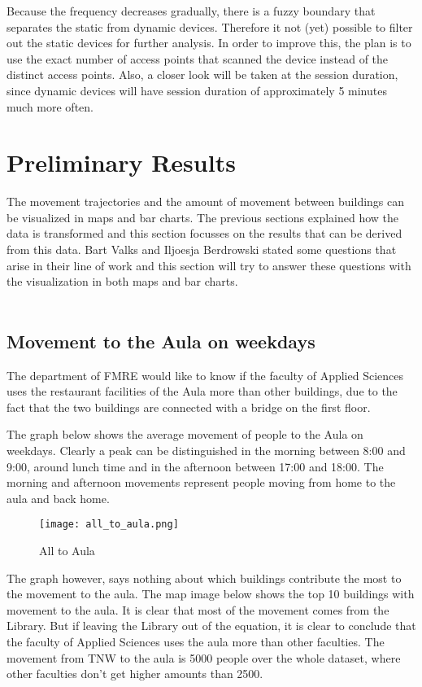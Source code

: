 Because the frequency decreases gradually, there is a fuzzy boundary that separates the static from dynamic devices. Therefore it not (yet) possible to filter out the static devices for further analysis. In order to improve this, the plan is to use the exact number of access points that scanned the device instead of the distinct access points. Also, a closer look will be taken at the session duration, since dynamic devices will have session duration of approximately 5 minutes much more often. 


\section{Preliminary Results}\label{results}

The movement trajectories and the amount of movement between buildings can be visualized in maps and bar charts. The previous sections explained how the data is transformed and this section focusses on the results that can be derived from this data. Bart Valks and Iljoesja Berdrowski stated some questions that arise in their line of work and this section will try to answer these questions with the visualization in both maps and bar charts.
\\\\
\subsection{Movement to the Aula on weekdays}

The department of FMRE would like to know if the faculty of Applied Sciences uses the restaurant facilities of the Aula more than other buildings, due to the fact that the two buildings are connected with a bridge on the first floor.

The graph below shows the average movement of people to the Aula on weekdays. Clearly a peak can be distinguished in the morning between 8:00 and 9:00, around lunch time and in the afternoon between 17:00 and 18:00. The morning and afternoon movements represent people moving from home to the aula and back home.
\begin{figure}[H]
\centering
\texttt{[image: all\_to\_aula.png]}
\captionsetup{justification=centering}
\caption{All to Aula}
\label{figure:all to aula}
\end{figure}

The graph however, says nothing about which buildings contribute the most to the movement to the aula. The map image below shows the top 10 buildings with movement to the aula. It is clear that most of the movement comes from the Library. But if leaving the Library out of the equation, it is clear to conclude that the faculty of Applied Sciences uses the aula more than other faculties. The movement from TNW to the aula is 5000 people over the whole dataset, where other faculties don’t get higher amounts than 2500. 

